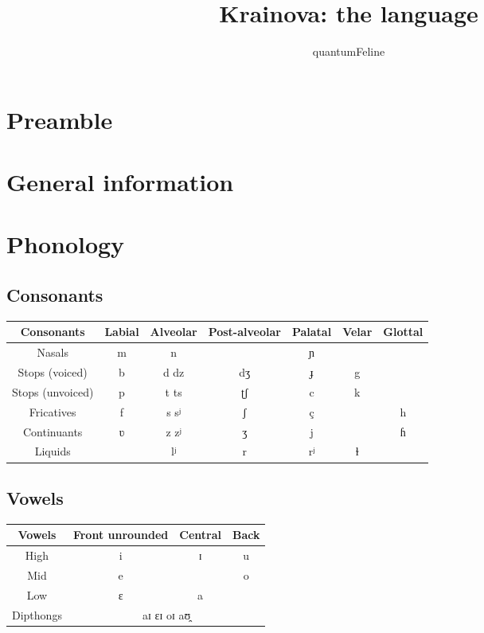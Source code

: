 \documentclass[12pt]{article}
\begin{document}
	\title{Krainova: the language}
	\author{quantumFeline}
	\maketitle

	\section{Preamble}

	\tableofcontents

	\section{General information}
	
	

	\section{Phonology}

	\subsection{Consonants}

	\begin{tabular}{||c | c c c c c c ||}
		\hline
		Consonants & Labial & Alveolar &
		Post-alveolar & Palatal & Velar & Glottal \\
		\hline
		Nasals & m & n & & ɲ & & \\
		Stops (voiced)   & b & d dz & dʒ & ɟ & g & \\
		Stops (unvoiced) & p & t ts & ʈʃ & c & k & \\
		Fricatives & f & s sʲ & ʃ & ç & & h \\
		Continuants & ʋ & z zʲ & ʒ & j & & ɦ \\
		Liquids & & lʲ & r & rʲ & ɫ & \\
		\hline
	\end{tabular}

	\subsection{Vowels}

	\begin{tabular}{|| c | c c c || }
		\hline
		Vowels & Front unrounded & Central & Back \\
		\hline
		High & i & ɪ & u \\
		Mid & e &  & o \\
		Low & ɛ & a & \\
		Dipthongs & \multicolumn{3}{c||}{aɪ ɛɪ oɪ aʊ̯} \\
		\hline
	\end{tabular}
\end{document}
